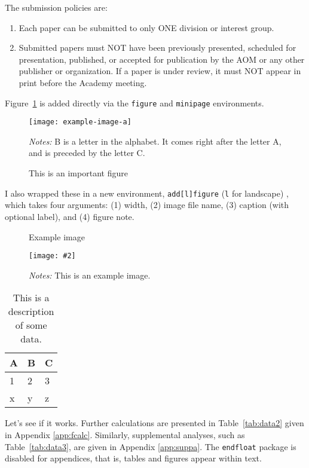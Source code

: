 \documentclass[12pt,letterpaper]{article}
\theoremstyle{plain}
\newenvironment{lfigure}[1][h]{
    \begin{landscape}
    \begin{figure}[#1]
}{
    \end{figure}
    \end{landscape}
}
\newcommand\figurenote[2][width=\linewidth]{
    \captionsetup{#1,font=small}
    \caption*{\textit{Notes:} {#2}}
}
\newenvironment{addlfigure}[4]{
    \begin{lfigure}[h]
        \centering
        \caption{#3}
        \begin{minipage}{#1}
            \texttt{[image: \#2]}
            \figurenote{#4}
}{\end{minipage}\end{lfigure}}
\begin{document}
\blindtext

The submission policies are:
\begin{enumerate}
    \item Each paper can be submitted to only ONE division or interest group.
    \item Submitted papers must NOT have been previously presented, scheduled for presentation, published, or accepted for publication by the AOM or any other publisher or organization. If a paper is under review, it must NOT appear in print before the Academy meeting.
\end{enumerate}

Figure~\ref{fig:a} is added directly via the \verb*|figure| and \verb*|minipage| environments.

\begin{figure}[h]
    \centering
    \caption{This is an important figure}\label{fig:a}
    \begin{minipage}{.5\linewidth}
    \texttt{[image: example-image-a]}
    \figurenote{B is a letter in the alphabet. It comes right after the letter A, and is preceded by the letter C. \blindtext}
    \end{minipage}
\end{figure}

I also wrapped these in a new environment, \verb*|add[l]figure| (\verb*|l| for landscape) , which takes four arguments: (1) width, (2) image file name, (3) caption (with optional label), and (4) figure note.

\begin{addlfigure}{0.25\linewidth}
	{example-image-b}{Example image\label{fig:b}}
	{This is an example image. \blindtext}
\end{addlfigure}

\blindtext

\begin{table}[h]
    \centering
    \caption{This is a description of some data.}
    \label{tab:data1}
    \begin{tabular}{|l|l|l|}
        \hline
        A & B & C \\ \hline \hline
        1 & 2 & 3 \\ \hline
        x & y & z \\ \hline
    \end{tabular}
\end{table}

Let's see if it works. Further calculations are presented in Table~\ref{tab:data2} given in Appendix \ref{app:fcalc}. Similarly, supplemental analyses, such as Table~\ref{tab:data3}, are given in Appendix \ref{app:suppa}. The \verb*|endfloat| package is disabled for appendices, that is, tables and figures appear within text.
\end{document}
